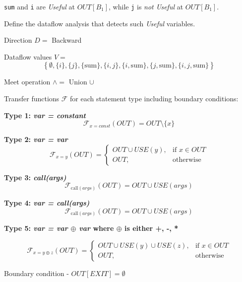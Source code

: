 \documentclass[12pt]{article}
\begin{document}
\begin{enumerate}
        \lstinline$sum$ and \lstinline$i$ are \emph{Useful} at $OUT[B_1]$,
      while \lstinline$j$ is \emph{not Useful} at $OUT[B_1]$.


      Define the dataflow analysis that detects such \emph{Useful} variables.

      \begin{mdframed}
        Direction $D =$  Backward
        

        Dataflow values $V =  $ \[
        \left\{
        \emptyset, 
        \{i\}, 
        \{j\}, 
        \{\text{sum}\}, 
        \{i, j\}, 
        \{i, \text{sum}\}, 
        \{j, \text{sum}\}, 
        \{i, j, \text{sum}\}
        \right\}
        \]

        Meet operation $\wedge =$ Union $\cup$

        Transfer functions $\mathcal{F}$ for each statement type including boundary conditions:  

        \textbf{Type 1: \textit{var = constant}}
        \[
            \mathcal{F}_{x=const}(OUT)= OUT \setminus \{x\}
        \]

        \textbf{Type 2: \textit{var = var}}
        \[
        \mathcal{F}_{x = y}(OUT) =
          \begin{cases}
            OUT\cup USE(y), & \text{if } x \in OUT \\
            OUT, & \text{otherwise}
          \end{cases}
        \]


        \textbf{Type 3: \textit{call(args)}}
        \[
        \mathcal{F}_{\text{call}(args)}(OUT) = OUT \cup USE(args)
        \]

        \textbf{Type 4: \textit{ var = call(args)}}
        \[
        \mathcal{F}_{\text{call}(args)}(OUT) = OUT \cup USE(args)
        \]

        \textbf{Type 5: \textit{ var = var $\oplus$ var }where $\oplus$ is either +, -, * }

         \[
        \mathcal{F}_{x = y \oplus z }(OUT) =
          \begin{cases}
            OUT\cup USE(y)\cup USE(z), & \text{if } x \in OUT \\
            OUT, & \text{otherwise}
          \end{cases}
        \]

        Boundary condition - $OUT[EXIT] = \emptyset$   

      \end{mdframed}        
      

\end{enumerate}
\end{document}
